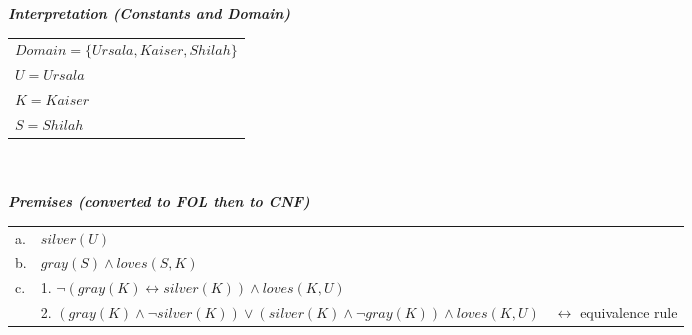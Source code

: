 \documentclass{article}
\begin{document}
\begin{enumerate}
    \textit{\textbf{Interpretation (Constants and Domain)}}\\
    \begin{tabular}{l}
        $Domain = \{Ursala, Kaiser, Shilah\}$\\
        $U = Ursala$\\
        $K = Kaiser$\\
        $S = Shilah$\\
    \end{tabular}\\\\
    \textit{\textbf{Premises (converted to FOL then to CNF)}}\\
    \begin{tabular}{lll}
        a. & $silver(U)$\\
        b. & $gray(S) \wedge loves(S, K)$\\
        c. & 1. $\neg(gray(K) \leftrightarrow silver(K)) \wedge loves(K, U)$ \\
           & 2. $(gray(K) \wedge \neg silver(K)) \vee (silver(K) \wedge \neg gray(K)) \wedge loves(K, U)$ & $\leftrightarrow$ equivalence rule\\


\end{tabular}
\end{enumerate}
\end{document}
